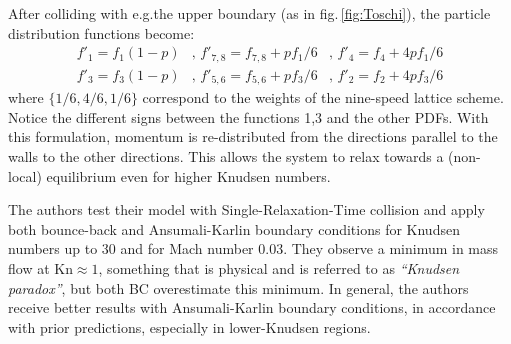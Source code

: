 After colliding with e.g.\@ the upper boundary (as in fig.\,\ref{fig:Toschi}),
the particle distribution functions become:
\begin{eqnarray*}
 f'_1 = f_1(1-p) &\textrm{, \ \ } f'_{7,8} = f_{7,8} + p f_1 / 6 &\textrm{, \ \ } f'_4 = f_4 + 4 p f_1 / 6 \\
 f'_3 = f_3(1-p) &\textrm{, \ \ } f'_{5,6} = f_{5,6} + p f_3 / 6 &\textrm{, \ \ } f'_2 = f_2 + 4 p f_3 / 6
\end{eqnarray*}
where $\{ 1/6, 4/6, 1/6 \}$ correspond to the weights of the nine-speed lattice scheme.
Notice the different signs between the functions 1,3 and the other PDFs. With this formulation,
momentum is re-distributed from the directions parallel to the walls to the other directions.
This allows the system to relax towards a (non-local) equilibrium even for higher Knudsen numbers.

The authors test their model with Single-Relaxation-Time collision and apply both bounce-back
and Ansumali-Karlin boundary conditions for Knudsen numbers up to 30 and for Mach number 0.03.
They observe a minimum in mass flow at $\mathrm{Kn}\approx 1$, something that is physical
and is referred to as \textit{``Knudsen paradox''}, but both BC overestimate this minimum.
In general, the authors receive better results with Ansumali-Karlin boundary conditions,
in accordance with prior predictions, especially in lower-Knudsen regions.
